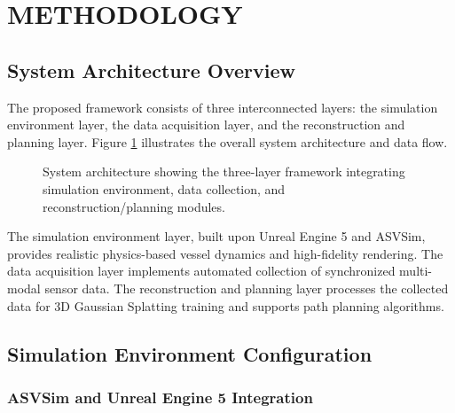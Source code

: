 \clearpage
\section{METHODOLOGY}

\subsection{System Architecture Overview}

The proposed framework consists of three interconnected layers: the simulation environment layer, the data acquisition layer, and the reconstruction and planning layer. Figure \ref{fig:system_architecture} illustrates the overall system architecture and data flow.

\begin{figure}[htbp]
\centering
\caption{System architecture showing the three-layer framework integrating simulation environment, data collection, and reconstruction/planning modules.}
\label{fig:system_architecture}
\end{figure}

The simulation environment layer, built upon Unreal Engine 5 and ASVSim, provides realistic physics-based vessel dynamics and high-fidelity rendering. The data acquisition layer implements automated collection of synchronized multi-modal sensor data. The reconstruction and planning layer processes the collected data for 3D Gaussian Splatting training and supports path planning algorithms.

\subsection{Simulation Environment Configuration}

\subsubsection{ASVSim and Unreal Engine 5 Integration}

